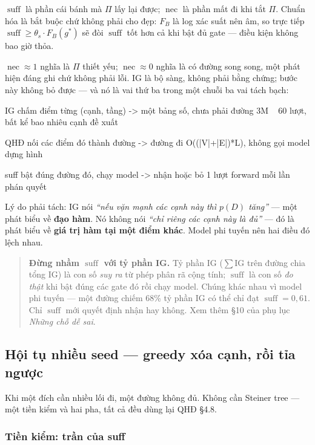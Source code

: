 \documentclass[11pt,a4paper]{article}
\DeclareMathOperator{\suff}{suff}
\DeclareMathOperator{\nec}{nec}
\begin{document}
$\suff$ là phần cái bánh mà $\Pi$ lấy lại được; $\nec$ là phần mất đi khi tắt $\Pi$.
Chuẩn hóa là bắt buộc chứ không phải cho đẹp: $F_B$ là log xác suất nên âm, so trực tiếp
$\suff\ge\theta_s\cdot F_B(g^\ast)$ sẽ đòi $\suff$ tốt hơn cả khi bật đủ gate --- điều kiện
không bao giờ thỏa.

$\nec\approx 1$ nghĩa là $\Pi$ thiết yếu; $\nec\approx 0$ nghĩa là có đường song song, một
phát hiện đáng ghi chứ không phải lỗi. IG là bộ sàng, không phải bằng chứng; bước này không bỏ được --- và nó là vai thứ ba
trong một chuỗi ba vai tách bạch:

\begin{dia}
IG     chấm điểm từng (cạnh, tầng)       ->  một bảng số, chưa phải đường
       3M ~ 60 lượt, bất kể bao nhiêu cạnh      đề xuất

QHĐ    nối các điểm đó thành đường       ->  đường đi
       O((|V|+|E|)*L), không gọi model          dựng hình

suff   bật đúng đường đó, chạy model     ->  nhận hoặc bỏ
       1 lượt forward mỗi lần                   phán quyết
\end{dia}

Lý do phải tách: IG nói \emph{``nếu vặn mạnh các cạnh này thì $p(D)$ tăng''} --- một phát
biểu về \textbf{đạo hàm}. Nó không nói \emph{``chỉ riêng các cạnh này là đủ''} --- đó là
phát biểu về \textbf{giá trị hàm tại một điểm khác}. Model phi tuyến nên hai điều đó lệch
nhau.

\begin{quote}
\textbf{Đừng nhầm $\suff$ với tỷ phần IG.} Tỷ phần IG ($\sum$IG trên đường chia tổng IG)
là con số \emph{suy ra} từ phép phân rã cộng tính; $\suff$ là con số \emph{đo thật} khi
bật đúng các gate đó rồi chạy model. Chúng khác nhau vì model phi tuyến --- một đường
chiếm 68\% tỷ phần IG có thể chỉ đạt $\suff=0{,}61$. Chỉ $\suff$ mới quyết định nhận hay
không. Xem thêm \S10 của phụ lục \emph{Những chỗ dễ sai}.
\end{quote}

\subsection{Hội tụ nhiều seed --- greedy xóa cạnh, rồi tỉa ngược}\label{sec:confluence}

Khi một đích cần nhiều lối đi, một đường không đủ. Không cần Steiner tree --- một tiền kiểm
và hai pha, tất cả đều dùng lại QHĐ \S4.8.

\subsubsection*{Tiền kiểm: trần của suff}
\end{document}

